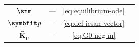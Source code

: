 {\begin{table}[H]
\begin{tabular}{clcl}
        \(\snm\) & --- & \eqref{eq:equilibrium-ode} \\
        \(\IesanVector\) & --- & \eqref{eq:def-iesan-vector}\\
        \(\widehat{\mathbf{K}}_{\rm p}\) & --- & \eqref{eq:G0-neg-m} \\
    \bottomrule
    \end{tabular}
\end{table}
}

\SummarySaintVenant
